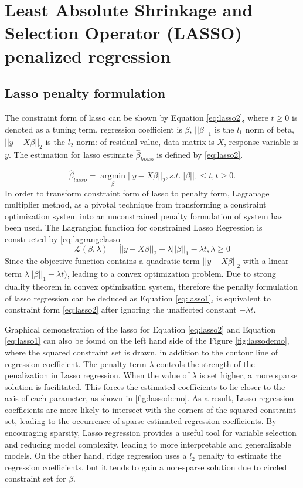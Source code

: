 \section{Least Absolute Shrinkage and Selection Operator (LASSO) penalized regression}
\subsection{Lasso penalty formulation}
The constraint form of lasso can be shown by Equation \ref{eq:lasso2}, where $t \geq 0$ is denoted as a tuning term, regression coefficient is $\beta$, $||\beta||_1$ is the $l_1$ norm of beta, $||y-X\beta||_2$ is the $l_2$ norm: of residual value, data matrix is $X$, response variable is $y$. The estimation for lasso estimate $\hat{\beta}_{lasso}$ is defined by \autoref{eq:lasso2}. 

\begin{equation}
	\label{eq:lasso2}
	\hat{\beta}_{lasso} = \underset{\beta}{\operatorname{argmin}} ||y-X\beta||_2, s.t. ||\beta||_1 \leq t, t \geq 0.
\end{equation}
In order to transform constraint form of lasso to penalty form, Lagranage multiplier method, as a pivotal technique from transforming a constraint optimization system into an unconstrained penalty formulation of system has been used. The Lagrangian function for constrained Lasso Regression is constructed by \autoref{eq:lagrangelasso}
\begin{equation}
	\label{eq:lagrangelasso}
	\mathcal{L}(\beta,\lambda) =  ||y-X\beta||_2 + \lambda||\beta||_1 - \lambda t, \lambda \geq 0
\end{equation}
Since the objective function contains a quadratic term $||y-X\beta||_2$ with a linear term $\lambda||\beta||_1 - \lambda t)$, leading to a convex optimization problem. Due to strong duality theorem in convex optimization system, therefore the penalty formulation of lasso regression can be deduced as Equation \autoref{eq:lasso1}, is equivalent to constraint form \autoref{eq:lasso2} after ignoring the unaffected constant $-\lambda t$.


Graphical demonstration of the lasso for Equation \ref{eq:lasso2} and Equation \ref{eq:lasso1} can also be found on the left hand side of the Figure \ref{fig:lassodemo}, where the squared constraint set is drawn, in addition to the contour line of regression coefficient. The penalty term $\lambda$ controls the strength of the penalization in Lasso regression. When the value of $\lambda$ is set higher, a more sparse solution is facilitated. This forces the estimated coefficients to lie closer to the axis of each parameter, as shown in \ref{fig:lassodemo}. As a result, Lasso regression coefficients are more likely to intersect with the corners of the squared constraint set, leading to the occurrence of sparse estimated regression coefficients. By encouraging sparsity, Lasso regression provides a useful tool for variable selection and reducing model complexity, leading to more interpretable and generalizable models. On the other hand, ridge regression uses a $l_2$ penalty to estimate the regression coefficients, but it tends to gain a non-sparse solution due to circled constraint set for $\beta$.

